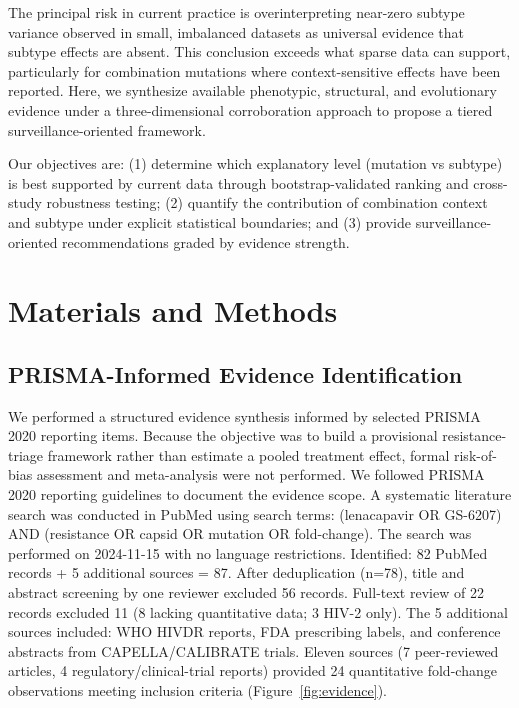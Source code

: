 \documentclass[12pt,a4paper]{article}
\begin{document}
The principal risk in current practice is overinterpreting near-zero subtype variance observed in small, imbalanced datasets as universal evidence that subtype effects are absent. This conclusion exceeds what sparse data can support, particularly for combination mutations where context-sensitive effects have been reported. Here, we synthesize available phenotypic, structural, and evolutionary evidence under a three-dimensional corroboration approach to propose a tiered surveillance-oriented framework.

Our objectives are: (1) determine which explanatory level (mutation vs subtype) is best supported by current data through bootstrap-validated ranking and cross-study robustness testing; (2) quantify the contribution of combination context and subtype under explicit statistical boundaries; and (3) provide surveillance-oriented recommendations graded by evidence strength.

\section{Materials and Methods}

\subsection{PRISMA-Informed Evidence Identification}

We performed a structured evidence synthesis informed by selected PRISMA 2020 reporting items. Because the objective was to build a provisional resistance-triage framework rather than estimate a pooled treatment effect, formal risk-of-bias assessment and meta-analysis were not performed. We followed PRISMA 2020 reporting guidelines \cite{Page2021} to document the evidence scope. A systematic literature search was conducted in PubMed using search terms: (lenacapavir OR GS-6207) AND (resistance OR capsid OR mutation OR fold-change). The search was performed on 2024-11-15 with no language restrictions. Identified: 82 PubMed records + 5 additional sources = 87. After deduplication (n=78), title and abstract screening by one reviewer excluded 56 records. Full-text review of 22 records excluded 11 (8 lacking quantitative data; 3 HIV-2 only). The 5 additional sources included: WHO HIVDR reports, FDA prescribing labels, and conference abstracts from CAPELLA/CALIBRATE trials. Eleven sources (7 peer-reviewed articles, 4 regulatory/clinical-trial reports) provided 24 quantitative fold-change observations meeting inclusion criteria (Figure~\ref{fig:evidence}).
\end{document}
